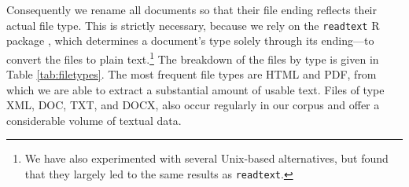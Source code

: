 \documentclass[11pt]{article}
\begin{document}
Consequently we rename all documents so that their file ending reflects their actual file type. This is strictly necessary, because we rely on the \texttt{readtext} R package \citep{readtext}, which determines a document's type solely through its ending---to convert the files to plain text.\footnote{We have also experimented with several Unix-based alternatives, but found that they largely led to the same results as \texttt{readtext}.} The breakdown of the files by type is given in Table \ref{tab:filetypes}. The most frequent file types are HTML and PDF, from which we are able to extract a substantial amount of usable text. Files of type XML, DOC, TXT, and DOCX, also occur regularly in our corpus and offer a considerable volume of textual data.




\end{document}
